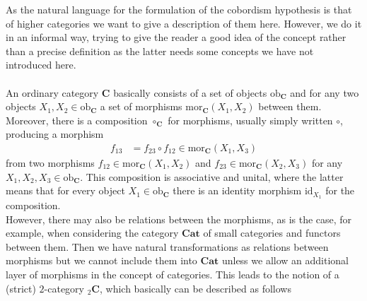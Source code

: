 As the natural language for the formulation of the cobordism hypothesis is that of higher categories we want to give a description of them here. However, we do it in an informal way, trying to give the reader a good idea of the concept rather than a precise definition as the latter needs some concepts we have not introduced here.
\\\\
An ordinary category $\mathbf{C}$ basically consists of a set of objects $\mathrm{ob}_{\mathbf{C}}$ and for any two objects $X_{1},X_{2} \in \mathrm{ob}_{\mathbf{C}}$ a set of morphisms $\mathrm{mor}_{\mathbf{C}}(X_{1},X_{2})$ between them. Moreover, there is a composition $\circ_{\mathbf{C}}$ for morphisms, usually simply written $\circ$, producing a morphism
\begin{align*}
  f_{13}
  &=
  f_{23}
  \circ
  f_{12}
  \in
  \mathrm{mor}_{\mathbf{C}}(X_{1},X_{3})
\end{align*}
from two morphisms $f_{12} \in \mathrm{mor}_{\mathbf{C}}(X_{1},X_{2})$ and $f_{23} \in \mathrm{mor}_{\mathbf{C}}(X_{2},X_{3})$ for any $X_{1},X_{2},X_{3} \in \mathrm{ob}_{\mathbf{C}}$. This composition is associative and unital, where the latter means that for every object $X_{1} \in \mathrm{ob}_{\mathbf{C}}$ there is an identity morphism $\mathrm{id}_{X_{1}}$ for the composition.
\\
However, there may also be relations between the morphisms, as is the case, for example, when considering the category $\mathbf{Cat}$ of small categories and functors between them. Then we have natural transformations as relations between morphisms but we cannot include them into $\mathbf{Cat}$ unless we allow an additional layer of morphisms in the concept of categories. This leads to the notion of a (strict) $2$-category ${_{2}\mathbf{C}}$, which basically can be described as follows
